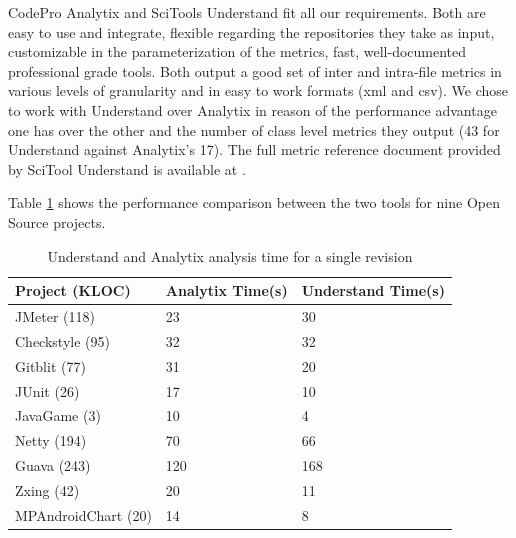 CodePro Analytix and SciTools Understand fit all our requirements. Both are easy to use and integrate, flexible regarding the repositories they take as input, customizable in the parameterization of the metrics, fast, well-documented professional grade tools. Both output a good set of inter and intra-file metrics in various levels of granularity and in easy to work formats (xml and csv). We chose to work with Understand over Analytix in reason of the performance advantage one has over the other and the number of class level metrics they output (43 for Understand against Analytix’s 17). The full metric reference document provided by SciTool Understand is available at \cite{ref:und}.

Table \ref{tab:und_ana_times} shows the performance comparison between the two tools for nine Open Source projects.

\begin{table}[h]
  \centering
  \caption{Understand and Analytix analysis time for a single revision}
  \label{tab:und_ana_times}
  \begin{tabular}{|l|l|l|}
    \hline
    \textbf{Project (KLOC)} & \textbf{Analytix Time(s)} & \textbf{Understand Time(s)} \\ \hline
    JMeter (118)            & 23                        & 30                          \\ \hline
    Checkstyle (95)         & 32                        & 32                          \\ \hline
    Gitblit (77)            & 31                        & 20                          \\ \hline
    JUnit (26)              & 17                        & 10                          \\ \hline
    JavaGame (3)            & 10                        & 4                           \\ \hline
    Netty (194)             & 70                        & 66                          \\ \hline
    Guava (243)             & 120                       & 168                         \\ \hline
    Zxing (42)              & 20                        & 11                          \\ \hline
    MPAndroidChart (20)     & 14                        & 8                           \\ \hline
  \end{tabular}
\end{table}


